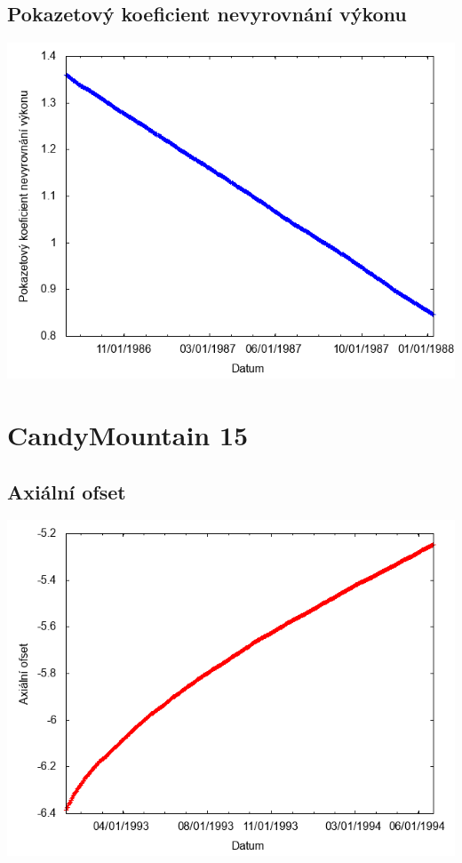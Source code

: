 \documentclass[a4paper,twoside,11pt]{article}
\begin{document}
\subsection*{Pokazetový koeficient nevyrovnání výkonu}
\begin{center}
\includegraphics[width=.8\textwidth]{graphs/CandyMountain_14_fha.png}
\end{center}

\newpage
\section*{CandyMountain 15}
\subsection*{Axiální ofset}
\begin{center}
\includegraphics[width=.8\textwidth]{graphs/CandyMountain_15_ao.png}
\end{center}
\end{document}
